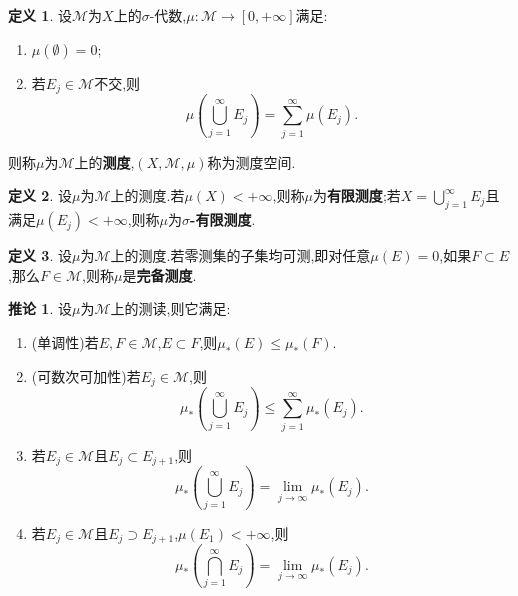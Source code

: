 \documentclass{ctexart}
\theoremstyle{definition}
\newtheorem{definition}{定义}
\newtheorem{corollary}{推论}
\theoremstyle{remark}
\begin{document}
	\begin{definition}
		设$\mathcal{M}$为$X$上的$\sigma$-代数,$\mu:\mathcal{M}\to[0,+\infty]$满足:
		\begin{enumerate}
			\item $\mu(\emptyset)=0$;
			\item 若$E_j\in\mathcal{M}$不交,则
			$$\mu\left(\bigcup_{j=1}^\infty{E_j}\right)=\sum_{j=1}^\infty{\mu(E_j)}.$$
		\end{enumerate}
		则称$\mu$为$\mathcal{M}$上的\textbf{测度},$(X,\mathcal{M},\mu)$称为测度空间.
	\end{definition}
	\begin{definition}
		设$\mu$为$\mathcal{M}$上的测度.若$\mu(X)<+\infty$,则称$\mu$为\textbf{有限测度};若$X=\bigcup_{j=1}^\infty{E_j}$且满足$\mu(E_j)<+\infty$,则称$\mu$为\textbf{$\sigma$-有限测度}.
	\end{definition}
	\begin{definition}
		设$\mu$为$\mathcal{M}$上的测度.若零测集的子集均可测,即对任意$\mu(E)=0$,如果$F\subset E$,那么$F\in\mathcal{M}$,则称$\mu$是\textbf{完备测度}.
	\end{definition}
	\begin{corollary}
		设$\mu$为$\mathcal{M}$上的测读,则它满足:
		\begin{enumerate}
			\item (单调性)若$E,F\in\mathcal{M}$,$E\subset F$,则$\mu_*(E)\le \mu_*(F)$.
			\item (可数次可加性)若$E_j\in\mathcal{M}$,则
			$$\mu_*\left(\bigcup_{j=1}^\infty{E_j}\right)\le\sum_{j=1}^\infty{\mu_*(E_j)}.$$
			\item 若$E_j\in\mathcal{M}$且$E_j\subset E_{j+1}$,则
			$$\mu_*\left(\bigcup_{j=1}^\infty{E_j}\right)=\lim_{j\to\infty}{\mu_*(E_j)}.$$
			\item 若$E_j\in\mathcal{M}$且$E_j\supset E_{j+1}$,$\mu(E_1)<+\infty$,则
			$$\mu_*\left(\bigcap_{j=1}^\infty{E_j}\right)=\lim_{j\to\infty}{\mu_*(E_j)}.$$
		\end{enumerate}
	\end{corollary}
	
\end{document}
